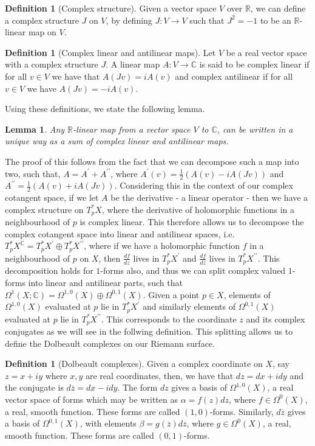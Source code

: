 \documentclass[11pt]{report}
\newtheorem{lemma}[thm]{Lemma}
\theoremstyle{definition}
\newtheorem{defn}[thm]{Definition}
\begin{document}
\begin{defn}[Complex structure]\label{Cstructure}
  Given a vector space $V$ over $\mathbb{R}$, we can define a complex structure $J$ on $V$, by defining $J : V \rightarrow V$ such that $J^2 = -1$ to be an $\mathbb{R}$-linear map on $V$.
\end{defn}
\begin{defn}[Complex linear and antilinear maps]
  Let $V$ be a real vector space with a complex structure $J$. A linear map $A: V \rightarrow \mathbb{C}$ is said to be complex linear if for all $v \in V$ we have that $A(Jv)=iA(v)$ and complex antilinear if for all $v \in V$ we have $A(Jv) = -iA(v)$.
\end{defn}
Using these definitions, we state the following lemma.
\begin{lemma}
  Any $\mathbb{R}$-linear map from a vector space $V$ to $\mathbb{C}$, can be written in a unique way as a sum of complex linear and antilinear maps.
\end{lemma}
The proof of this follows from the fact that we can decompose such a map into two, such that, $A = A^{\prime} + A^{\prime\prime}$, where $A^{\prime}(v) = \frac{1}{2}(A(v)-iA(Jv))$ and $A^{\prime\prime} = \frac{1}{2}(A(v)+iA(Jv))$. Considering this in the context of our complex cotangent space, if we let $A$ be the derivative - a linear operator - then we have a complex structure on $T_p^*X$, where the derivative of holomorphic functions in a neighbourhood of $p$ is complex linear. This therefore allows us to decompose the complex cotangent space into linear and antilinear spaces, i.e.\ $T_p^*X^{\mathbb{C}} = T_p^*X^{\prime} \oplus T_p^*X^{\prime\prime}$, where if we have a holomorphic function $f$ in a neighbourhood of $p$ on $X$, then $\frac{df}{dz}$ lives in $T_p^*X^{\prime}$ and $\frac{df}{d\overline{z}}$ lives in $T_p^*X^{\prime\prime}$. This decomposition holds for $1$-forms also, and thus we can split complex valued $1$-forms into linear and antilinear parts, such that $\Omega^1(X;\mathbb{C}) = \Omega^{1,0}(X) \oplus \Omega^{0,1}(X)$. Given a point $p \in X$, elements of $\Omega^{1,0}(X)$ evaluated at $p$ lie in $T_p^*X^{\prime}$ and similarly elements of $\Omega^{0,1}(X)$ evaluated at $p$ lie in $T_p^*X^{\prime\prime}$. This corresponds to the coordinate $z$ and its complex conjugates as we will see in the follwing definition. This splitting allows us to define the Dolbeault complexes on our Riemann surface.
\begin{defn}[Dolbeault complexes]
  Given a complex coordinate on $X$, say $z=x+iy$ where $x,y$ are real coordinates, then, we have that $dz = dx+idy$ and the conjugate is  $d\overline{z} = dx - idy$. The form $dz$ gives a basis of $\Omega^{1,0}(X)$, a real vector space of forms which may be written as $\alpha = f(z)dz$, where $f \in \Omega^0(X)$, a real, smooth function. These forms are called $(1,0)$-forms. Similarly, $d\overline{z}$ gives a basis of $\Omega^{0,1}(X)$, with elements $\beta = g(\overline{z})d\overline{z}$, where $g \in \Omega^0(X)$, a real, smooth function. These forms are called $(0,1)$-forms.
\end{defn}
\end{document}
